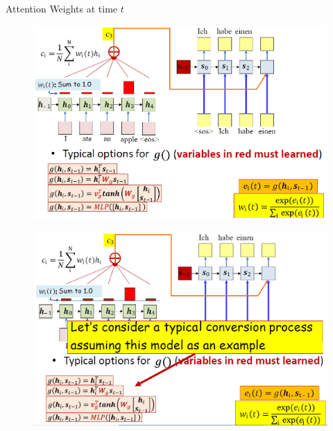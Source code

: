 \begin{frame}[allowframebreaks]{Attention Weights at time $t$}
    \begin{figure}
        \centering
        \includegraphics[width=\linewidth, height=0.9\textheight,keepaspectratio]{images/nlp/attention-weights-2.png}
    \end{figure}
    \framebreak
    \begin{figure}
        \centering
        \includegraphics[width=\linewidth, height=0.9\textheight,keepaspectratio]{images/nlp/attention-weights-3.png}
    \end{figure}
\end{frame}

